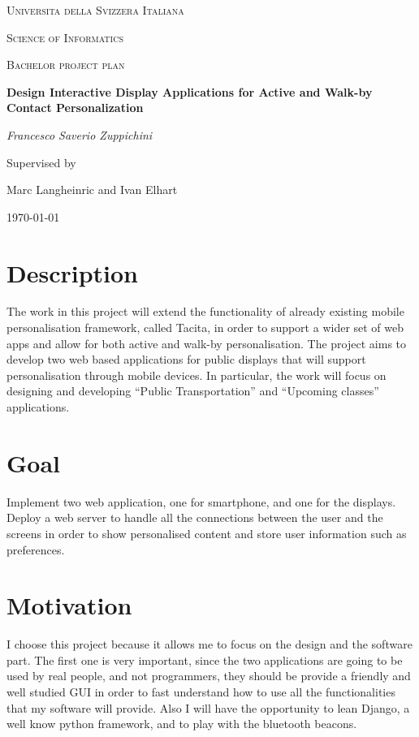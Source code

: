 \documentclass[11pt]{report}
\begin{document}
\begin{titlepage}
	\centering
	{\scshape\LARGE Universita della Svizzera Italiana\par}
		\vspace{0.5cm}

	{\scshape Science of Informatics\par}
	\vspace{1cm}
	{\scshape\Large Bachelor project plan\par}
	\vspace{1.5cm}
	{\huge\bfseries Design Interactive Display Applications for Active and Walk-by Contact Personalization\par}
	\vspace{2cm}
	{\Large\itshape Francesco Saverio Zuppichini\par}
	\vfill
	Supervised by\par
	Marc Langheinric and
	Ivan Elhart
	\vfill

	{\large \today\par}
\end{titlepage}
%
\section*{Description}
The work in this project will extend the functionality of already existing mobile personalisation framework, called Tacita, in order to support a wider set of web apps and allow for both active and walk-by personalisation. The project aims to develop two web based applications for public displays that will support personalisation through mobile devices. In particular, the work will focus on designing and developing “Public Transportation” and “Upcoming classes” applications. 
\section*{Goal}
Implement two web application, one for smartphone, and one for the displays. Deploy a web server to handle all the connections between the user and the screens in order to show personalised content and store user information such as preferences. 
\section*{Motivation}
I choose this project because it allows me to focus on the design and the software part. The first one is very important, since the two applications are going to be used by real people, and not programmers, they should be provide a friendly and well studied GUI in order to fast understand how to use all the functionalities that my software will provide. Also I will have the opportunity to lean Django, a well know python framework, and to play with the bluetooth beacons.
\end{document}
